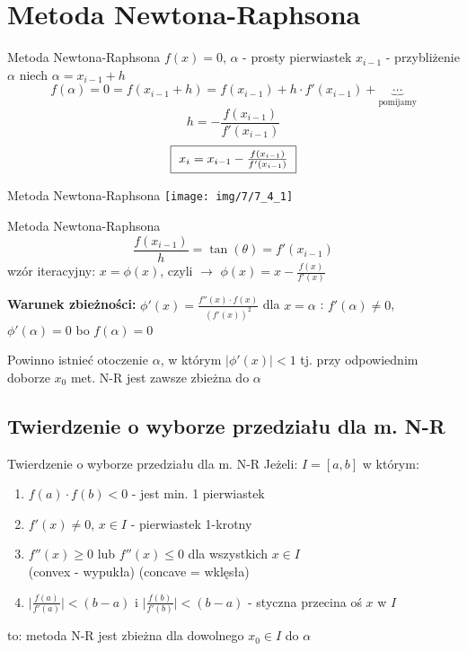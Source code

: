 \section{Metoda Newtona-Raphsona}
\begin{frame}{Metoda Newtona-Raphsona}
	$f(x) = 0$, $\alpha$ - prosty pierwiastek\linebreak
	$x_{i-1}$ - przybliżenie $\alpha$\linebreak
	niech $\alpha = x_{i-1} + h$
	\[
		f(\alpha) = 0 = f(x_{i-1} + h) = f(x_{i-1}) + h \cdot f'(x_{i-1}) + \underbrace{\cdots}_{\text{pomijamy}}
	\]
	\[
		h = - \frac{f(x_{i-1})}{f'(x_{i-1})}
	\]
	\[
		\fbox{ $x_{i} = x_{i-1} - \frac{f(x_{i-1})}{f'(x_{i-1})}$ }
	\]
\end{frame}
\begin{frame}{Metoda Newtona-Raphsona}
	\centering
	\texttt{[image: img/7/7\_4\_1]}
\end{frame}
\begin{frame}{Metoda Newtona-Raphsona}
	\[
		\frac{f(x_{i-1})}{h} = \tan(\theta) = f'(x_{i-1})
	\]
	wzór iteracyjny:
	$x = \phi(x)$, czyli $\rightarrow$ $\phi(x) = x - \frac{f(x)}{f'(x)}$\linebreak
	
	\textbf{Warunek zbieżności: } $\phi'(x) = \frac{f''(x) \cdot f(x)}{(f'(x))^{2}}$ dla $x = \alpha$ : $f'(\alpha) \neq 0$, $\phi'(\alpha) = 0$ bo $f(\alpha) = 0$\linebreak
	
	Powinno istnieć otoczenie $\alpha$, w którym $\lvert \phi'(x) \rvert < 1$ tj. przy odpowiednim doborze $x_{0}$ met. N-R jest zawsze zbieżna do $\alpha$
\end{frame}

\subsection{Twierdzenie o wyborze przedziału dla m. N-R}
\begin{frame}{Twierdzenie o wyborze przedziału dla m. N-R}
	Jeżeli: $I = \left[a, b\right]$ w którym:
	\begin{enumerate}
		\item $f(a) \cdot f(b) < 0$ - jest min. 1 pierwiastek
		\item $f'(x) \neq 0$, $x \in I$ - pierwiastek 1-krotny
		\item $f''(x) \geq 0$ lub $f''(x) \leq 0$ dla wszystkich $x \in I$\\
			(convex - wypukła) (concave = wklęsła)
		\item $\lvert \frac{f(a)}{f'(a)} \rvert < (b - a)$ i $\lvert \frac{f(b)}{f'(b)} \rvert < (b - a)$ - styczna przecina oś $x$  w  $I$
	\end{enumerate}
	to:
	metoda N-R jest zbieżna dla dowolnego $x_{0} \in I$ do $\alpha$
\end{frame}
